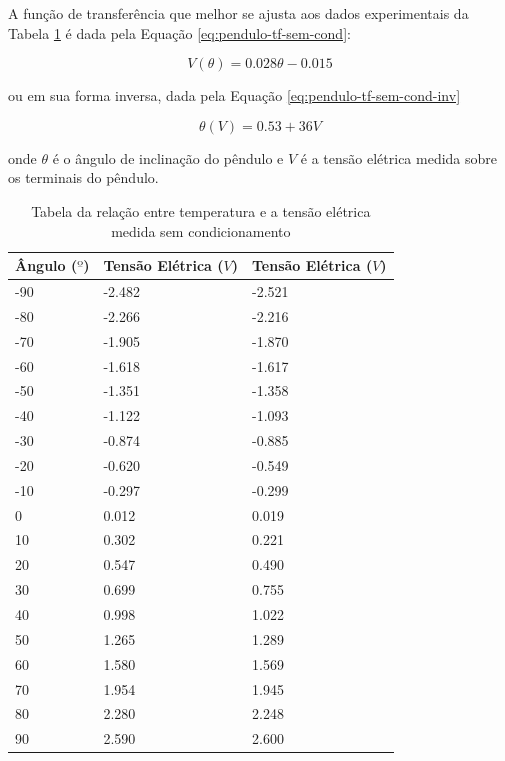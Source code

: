 \documentclass[a4paper]{instrumentacao}
\begin{document}
A função de transferência que melhor se ajusta aos dados experimentais da Tabela \ref{tab:pendulo-calibracao} é dada pela Equação \ref{eq:pendulo-tf-sem-cond}:

\begin{equation}
	V(\theta) = 0.028 \theta - 0.015
	\label{eq:pendulo-tf-sem-cond}
\end{equation}

\noindent 
ou em sua forma inversa, dada pela Equação \ref{eq:pendulo-tf-sem-cond-inv}

\begin{equation}
	\theta(V) = 0.53 + 36 V
	\label{eq:pendulo-tf-sem-cond-inv}
\end{equation}

\noindent
onde $\theta$ é o ângulo de inclinação do pêndulo e $V$ é a tensão elétrica medida sobre os terminais do pêndulo.

\begin{table}[]
\centering
\caption{Tabela da relação entre temperatura e a tensão elétrica medida sem condicionamento}
\begin{tabular}{|l|l|l|}
 \hline
 \textbf{Ângulo ($º$)} & \textbf{Tensão Elétrica ($V$)} & \textbf{Tensão Elétrica ($V$)} \\ \hline
 
 -90 & -2.482 & -2.521 	\\ \hline
 -80 & -2.266 & -2.216 	\\ \hline
 -70 & -1.905 & -1.870	\\ \hline
 -60 & -1.618 & -1.617 	\\ \hline
 -50 & -1.351 & -1.358 	\\ \hline
 -40 & -1.122 & -1.093 	\\ \hline
 -30 & -0.874 & -0.885 	\\ \hline
 -20 & -0.620 & -0.549 	\\ \hline
 -10 & -0.297 & -0.299 	\\ \hline
 0 & 0.012 & 0.019 		\\ \hline
 10 & 0.302 & 0.221 	\\ \hline
 20 & 0.547 & 0.490 	\\ \hline
 30 & 0.699 & 0.755 	\\ \hline
 40 & 0.998 & 1.022 	\\ \hline
 50 & 1.265 & 1.289 	\\ \hline
 60 & 1.580 & 1.569 	\\ \hline
 70 & 1.954 & 1.945 	\\ \hline
 80 & 2.280 & 2.248 	\\ \hline
 90 & 2.590 & 2.600 	\\ \hline
 
\end{tabular}
\label{tab:pendulo-calibracao}
\end{table}
\end{document}
